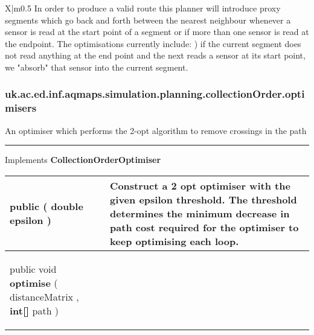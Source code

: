 {\begin{tabularx}{\linewidth}{X|m{0.5\textwidth}}
 In order to produce a valid route this planner will introduce proxy segments which go back and forth between the nearest neighbour\newline%
 whenever a sensor is read at the start point of a segment or if more than one sensor is read at the endpoint. The optimisations currently include:\newline%
  ) if the current segment does not read anything at the end point and the next reads a sensor at its start point, we "absorb" that sensor into\newline%
 the current segment.\\\end{tabularx}
}
\subsubsection*{ uk.ac.ed.inf.aqmaps.simulation.planning.collectionOrder.optimisers }
 {\scriptsize An optimiser which performs the 2{-}opt algorithm to remove crossings in the path
 
\vspace*{4pt} \hrule \vspace*{3pt}
Implements \textbf{ CollectionOrderOptimiser }
\vspace*{-5pt} 
\begin{tabularx}{\linewidth}{X|m{}}
\label{tab:Optimiser2Opt}
\begin{raggedleft}public  \textbf{\hyperref[tab:Optimiser2Opt]{\color{blue}{Optimiser2Opt}} }(\hspace*{ 5pt} \textbf{double} epsilon  )
\end{raggedleft} &
 Construct a 2 opt optimiser with the given epsilon threshold. The threshold determines the minimum decrease in path cost required for the optimiser to keep optimising each loop.\\ \hline 
\begin{raggedleft}public void \textbf{optimise }(\newline \hfill 
\hspace*{ 5pt} \textbf{\hyperref[tab:DistanceMatrix]{\color{blue}{DistanceMatrix}}} distanceMatrix , \newline
 \hspace*{ 5pt} \textbf{int{[}{]}} path  )
\end{raggedleft} &
 \\\end{tabularx}
}
